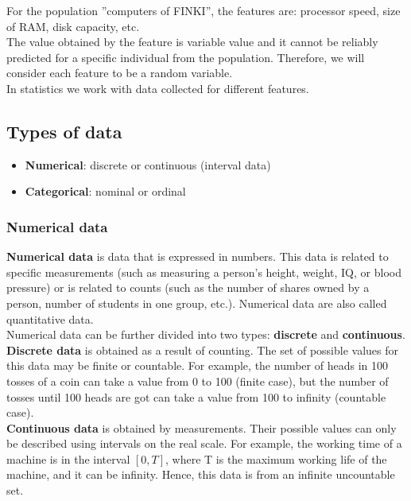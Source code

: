 \documentclass[a4paper, 12pt]{article}
\begin{document}
For the population ”computers of FINKI”, the features are: processor speed, size of
RAM, disk capacity, etc.\\

The value obtained by the feature is variable value and it cannot be reliably
predicted for a specific individual from the population. Therefore, we will consider
each feature to be a random variable.\\

In statistics we work with data collected for different features.

\subsection{Types of data}

\begin{itemize}
  \item \textbf{Numerical}: discrete or continuous (interval data)
  \item \textbf{Categorical}: nominal or ordinal
\end{itemize}

\subsubsection{Numerical data}

\textbf{Numerical data} is data that is expressed in numbers. This data is related to specific measurements (such as measuring a person's height, weight, IQ, or blood pressure) or is related to counts (such as the number of shares owned by a person, number of students in one group, etc.). Numerical data are also called quantitative data. \\

Numerical data can be further divided into two types: \textbf{discrete} and \textbf{continuous}.\\ 

\textbf{Discrete data} is obtained as a result of counting. The set of possible values for this data may be finite or countable. For example, the number of heads in 100 tosses of a coin can take a value from 0 to 100 (finite case), but the number of tosses until 100 heads are got can take a value from 100 to infinity (countable case).\\

\textbf{Continuous data} is obtained by measurements. Their possible values can only be described using intervals on the real scale. For example, the working time of a machine is in the interval $[0,T]$, where T is the maximum working life of the machine, and it can be infinity. Hence, this data is from an infinite uncountable set.
\end{document}
